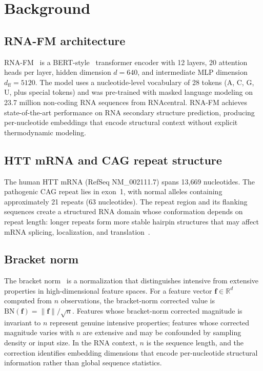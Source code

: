 \documentclass[11pt]{article}
\newcommand{\BN}{\mathrm{BN}}
\newcommand{\R}{\mathbb{R}}
\begin{document}
\section{Background}
\label{sec:background}

\subsection{RNA-FM architecture}

RNA-FM~\citep{rnafm} is a BERT-style~\citep{devlin2019bert}
transformer encoder with 12 layers, 20 attention heads per layer,
hidden dimension $d = 640$, and intermediate MLP dimension $d_{\mathrm{ff}} = 5120$.
The model uses a nucleotide-level vocabulary of 28 tokens (A, C, G, U,
plus special tokens) and was pre-trained with masked language modeling
on 23.7 million non-coding RNA sequences from RNAcentral.
%
RNA-FM achieves state-of-the-art performance on RNA secondary structure
prediction, producing per-nucleotide embeddings that encode structural
context without explicit thermodynamic modeling.

\subsection{HTT mRNA and CAG repeat structure}

The human HTT mRNA (RefSeq NM\_002111.7) spans 13{,}669 nucleotides.
The pathogenic CAG repeat lies in exon~1, with normal alleles containing
approximately 21 repeats (63 nucleotides). The repeat region and its
flanking sequences create a structured RNA domain whose conformation
depends on repeat length: longer repeats form more stable hairpin
structures that may affect mRNA splicing, localization, and
translation~\citep{demezer2011,sobczak2003}.

\subsection{Bracket norm}

The bracket norm~\citep{tower2026bn} is a normalization that
distinguishes intensive from extensive properties in high-dimensional
feature spaces. For a feature vector $\mathbf{f} \in \R^d$ computed
from $n$ observations, the bracket-norm corrected value is
$\BN(\mathbf{f}) = \|\mathbf{f}\| / \sqrt{n}$.
%
Features whose bracket-norm corrected magnitude is invariant to $n$
represent genuine intensive properties; features whose corrected
magnitude varies with $n$ are extensive and may be confounded by
sampling density or input size. In the RNA context, $n$ is the
sequence length, and the correction identifies embedding dimensions
that encode per-nucleotide structural information rather than
global sequence statistics.
\end{document}
